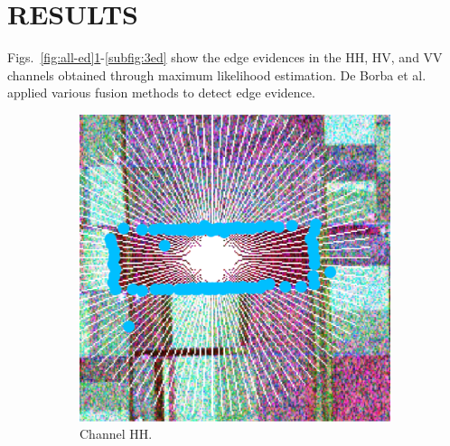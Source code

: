 \documentclass{article}
\begin{document}

\section{RESULTS} \label{sec_4}

Figs.~\ref{fig:all-ed}\ref{subfig:1ed}-\ref{subfig:3ed} show the edge evidences in the HH, HV, and VV channels obtained through maximum likelihood estimation.
De Borba et al.~\cite{DeBorba2020} applied various fusion methods to detect edge evidence. 
\begin{figure}[hbt]
    \begin{subfigure}{0.32\linewidth}
    \centering
    \includegraphics[width=\linewidth]{figures/hh_f.pdf}
    \caption{Channel HH.}
    \label{subfig:1ed}
  \end{subfigure}
  \begin{subfigure}{0.32\linewidth}
    \centering

\end{subfigure}
\end{figure}
\end{document}
